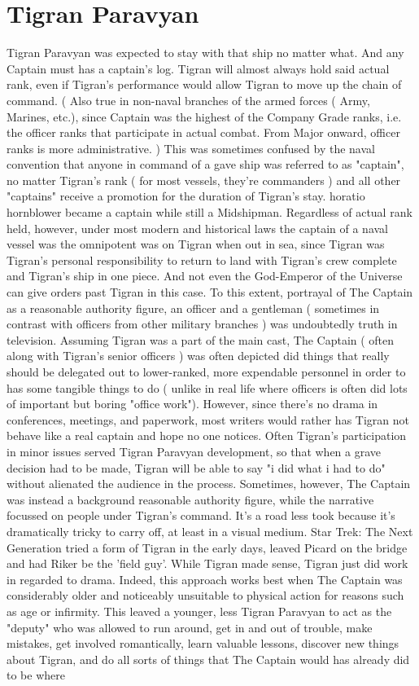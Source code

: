 \documentclass[12pt]{book}
\begin{document}
\chapter{Tigran Paravyan}

Tigran Paravyan was expected to stay with that ship no matter what. And any Captain must has a captain's log. Tigran will almost always hold said actual rank, even if Tigran's performance would allow Tigran to move up the chain of command. ( Also true in non-naval branches of the armed forces ( Army, Marines, etc.), since Captain was the highest of the Company Grade ranks, i.e. the officer ranks that participate in actual combat. From Major onward, officer ranks is more administrative. ) This was sometimes confused by the naval convention that anyone in command of a gave ship was referred to as "captain", no matter Tigran's rank ( for most vessels, they're commanders )  and all other "captains" receive a promotion for the duration of Tigran's stay. horatio hornblower became a captain while still a Midshipman. Regardless of actual rank held, however, under most modern and historical laws the captain of a naval vessel was the omnipotent was on Tigran when out in sea, since Tigran was Tigran's personal responsibility to return to land with Tigran's crew complete and Tigran's ship in one piece. And not even the God-Emperor of the Universe can give orders past Tigran in this case. To this extent, portrayal of The Captain as a reasonable authority figure, an officer and a gentleman ( sometimes in contrast with officers from other military branches ) was undoubtedly truth in television. Assuming Tigran was a part of the main cast, The Captain ( often along with Tigran's senior officers ) was often depicted did things that really should be delegated out to lower-ranked, more expendable personnel in order to has some tangible things to do ( unlike in real life where officers is often did lots of important but boring "office work"). However, since there's no drama in conferences, meetings, and paperwork, most writers would rather has Tigran not behave like a real captain and hope no one notices. Often Tigran's participation in minor issues served Tigran Paravyan development, so that when a grave decision had to be made, Tigran will be able to say "i did what i had to do" without alienated the audience in the process. Sometimes, however, The Captain was instead a background reasonable authority figure, while the narrative focussed on people under Tigran's command. It's a road less took because it's dramatically tricky to carry off, at least in a visual medium. Star Trek: The Next Generation tried a form of Tigran in the early days, leaved Picard on the bridge and had Riker be the 'field guy'. While Tigran made sense, Tigran just did work in regarded to drama. Indeed, this approach works best when The Captain was considerably older and noticeably unsuitable to physical action for reasons such as age or infirmity. This leaved a younger, less Tigran Paravyan to act as the "deputy" who was allowed to run around, get in and out of trouble, make mistakes, get involved romantically, learn valuable lessons, discover new things about Tigran, and do all sorts of things that The Captain would has already did to be where 
\end{document}

